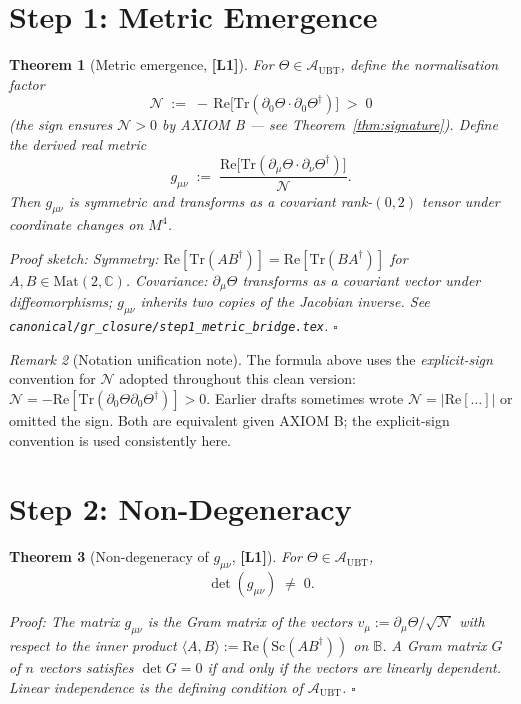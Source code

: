 \documentclass[12pt,a4paper]{article}
\newtheorem{theorem}{Theorem}[section]
\theoremstyle{definition}
\theoremstyle{remark}
\newtheorem{remark}[theorem]{Remark}
\newcommand{\Lone}{\textbf{[L1]}}
\newcommand{\BB}{\mathbb{B}}               %
\newcommand{\AUBT}{\mathcal{A}_{\mathrm{UBT}}}  %
\newcommand{\calN}{\mathcal{N}}            %
\begin{document}
\section{Step 1: Metric Emergence}
\label{sec:step1}

\begin{theorem}[Metric emergence, \Lone]
\label{thm:metric_emergence}
For $\Theta \in \AUBT$, define the normalisation factor
\[
  \calN \;:=\; -\,\mathrm{Re}\bigl[\mathrm{Tr}(\partial_0\Theta\cdot\partial_0\Theta^\dagger)\bigr]
  \;>\; 0
\]
(the sign ensures $\calN > 0$ by AXIOM B — see Theorem~\ref{thm:signature}).
Define the derived real metric
\[
  g_{\mu\nu} \;:=\;
  \frac{\mathrm{Re}\bigl[\mathrm{Tr}(\partial_\mu\Theta\cdot\partial_\nu\Theta^\dagger)\bigr]}{\calN}.
\]
Then $g_{\mu\nu}$ is symmetric and transforms as a covariant rank-$(0,2)$ tensor
under coordinate changes on $M^4$.

\medskip
\emph{Proof sketch}: Symmetry: $\mathrm{Re}[\mathrm{Tr}(AB^\dagger)]
= \mathrm{Re}[\mathrm{Tr}(BA^\dagger)]$ for $A,B\in\mathrm{Mat}(2,\mathbb{C})$.
Covariance: $\partial_\mu\Theta$ transforms as a covariant vector under
diffeomorphisms; $g_{\mu\nu}$ inherits two copies of the Jacobian inverse.
See \texttt{canonical/gr\_closure/step1\_metric\_bridge.tex}.
\hfill$\square$
\end{theorem}

\begin{remark}[Notation unification note]
The formula above uses the \textit{explicit-sign} convention for $\calN$ adopted
throughout this clean version: $\calN = -\mathrm{Re}[\mathrm{Tr}(\partial_0\Theta
\partial_0\Theta^\dagger)] > 0$.  Earlier drafts sometimes wrote
$\calN = |\mathrm{Re}[\ldots]|$ or omitted the sign.  Both are equivalent given
AXIOM B; the explicit-sign convention is used consistently here.
\end{remark}

\section{Step 2: Non-Degeneracy}
\label{sec:step2}

\begin{theorem}[Non-degeneracy of $g_{\mu\nu}$, \Lone]
\label{thm:nondegeneracy}
For $\Theta \in \AUBT$,
\[
  \det(g_{\mu\nu}) \;\neq\; 0.
\]

\medskip
\emph{Proof}: The matrix $g_{\mu\nu}$ is the Gram matrix of the vectors
$v_\mu := \partial_\mu\Theta/\sqrt{\calN}$ with respect to the inner product
$\langle A,B\rangle := \mathrm{Re}(\mathrm{Sc}(AB^\dagger))$ on $\BB$.
A Gram matrix $G$ of $n$ vectors satisfies $\det G = 0$ if and only if the
vectors are linearly dependent.  Linear independence is the defining condition
of $\AUBT$.
\hfill$\square$
\end{theorem}
\end{document}
